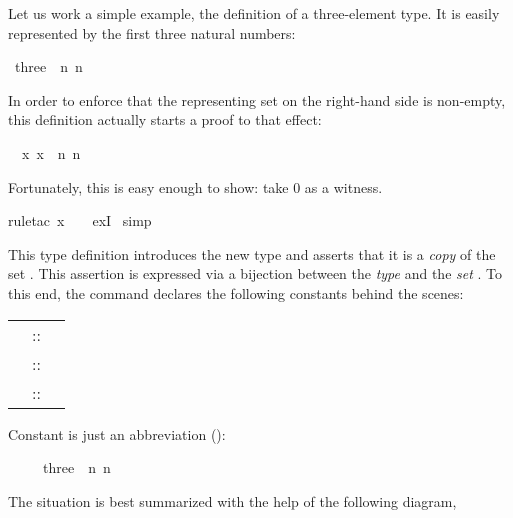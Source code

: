 \begin{isabellebody}
\begin{isamarkuptext}
Let us work a simple example, the definition of a three-element type.
It is easily represented by the first three natural numbers:%
\end{isamarkuptext}%
\ three\ {\isacharequal}\ {\isachardoublequote}{\isacharbraceleft}n{\isachardot}\ n\ {\isasymle}\ {}{\isacharbraceright}{\isachardoublequote}%
\begin{isamarkuptxt}%
\noindent{}%
In order to enforce that the representing set on the right-hand side is
non-empty, this definition actually starts a proof to that effect:
\begin{isabelle}%
\ {}{\isachardot}\ {\isasymexists}x{\isachardot}\ x\ {\isasymin}\ {\isacharbraceleft}n{\isachardot}\ n\ {\isasymle}\ {}{\isacharbraceright}%
\end{isabelle}
Fortunately, this is easy enough to show: take 0 as a witness.%
\end{isamarkuptxt}%
rule{\isacharunderscore}tac\ x\ {\isacharequal}\ {}\ \ exI{\isacharparenright}\isanewline
{}\ simp%
\begin{isamarkuptext}%
This type definition introduces the new type  and asserts
that it is a \emph{copy} of the set . This assertion
is expressed via a bijection between the \emph{type}  and the
\emph{set} . To this end, the command declares the following
constants behind the scenes:
\begin{center}
\begin{tabular}{rcl}
\isa{three} &::& \isa{nat\ set} \\
\isa{Rep{\isacharunderscore}three} &::& \isa{three\ {\isasymRightarrow}\ nat}\\
\isa{Abs{\isacharunderscore}three} &::& \isa{nat\ {\isasymRightarrow}\ three}
\end{tabular}
\end{center}
Constant  is just an abbreviation ():
\begin{isabelle}%
\ \ \ \ \ three\ {\isasymequiv}\ {\isacharbraceleft}n{\isachardot}\ n\ {\isasymle}\ {}{\isacharbraceright}%
\end{isabelle}
The situation is best summarized with the help of the following diagram,

\end{isamarkuptext}
\end{isabellebody}
